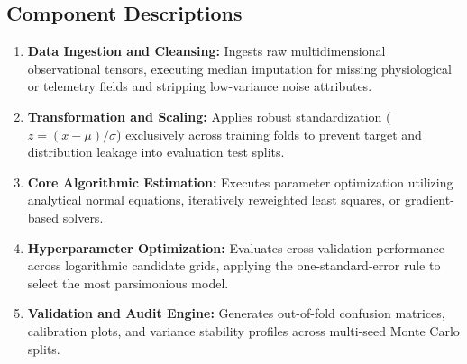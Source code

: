 \subsection{Component Descriptions}
\begin{enumerate}
  \item \textbf{Data Ingestion and Cleansing:} Ingests raw multidimensional observational tensors, executing median imputation for missing physiological or telemetry fields and stripping low-variance noise attributes.
  \item \textbf{Transformation and Scaling:} Applies robust standardization ($z = (x - \mu) / \sigma$) exclusively across training folds to prevent target and distribution leakage into evaluation test splits.
  \item \textbf{Core Algorithmic Estimation:} Executes parameter optimization utilizing analytical normal equations, iteratively reweighted least squares, or gradient-based solvers.
  \item \textbf{Hyperparameter Optimization:} Evaluates cross-validation performance across logarithmic candidate grids, applying the one-standard-error rule to select the most parsimonious model.
  \item \textbf{Validation and Audit Engine:} Generates out-of-fold confusion matrices, calibration plots, and variance stability profiles across multi-seed Monte Carlo splits.
\end{enumerate}
